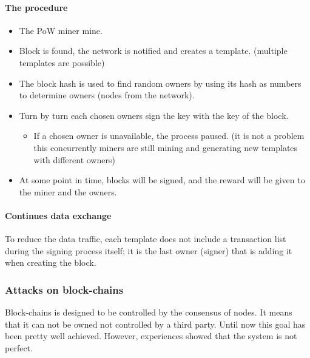 \paragraph{The procedure}
\begin{itemize}
\item The PoW miner mine.
\item Block is found, the network is notified and creates a template. (multiple templates are possible)
\item The block hash is used to find random owners by using its hash as numbers to determine owners (nodes from the network).
\item Turn by turn each chosen owners sign the key with the key of the block.
\begin{itemize}
\item If a chosen owner is unavailable, the process paused. (it is not a problem this concurrently miners are still mining and generating new templates with different owners)
\end{itemize}
\item At some point in time, blocks will be signed, and the reward will be given to the miner and the owners.
\end{itemize}

\paragraph{Continues data exchange}
To reduce the data traffic, each template does not include a transaction list during the signing process itself; it is the last owner (signer) that is adding it when creating the block.

\subsubsection{Attacks on block-chains}
Block-chains is designed to be controlled by the consensus of nodes. It means that it can not be owned not controlled by a third party. Until now this goal has been pretty well achieved. However, experiences showed that the system is not perfect.

